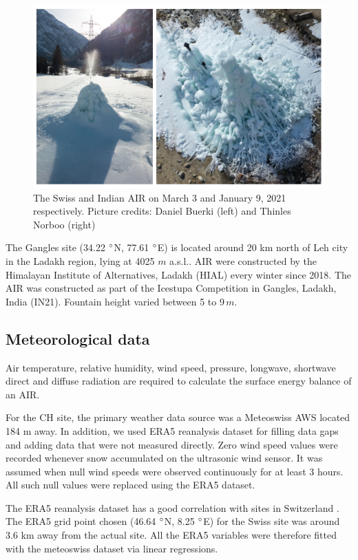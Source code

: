 \documentclass[utf8]{frontiersSCNS} %
\begin{document}
\begin{figure}
	\begin{center}
		\includegraphics[width=12 cm]{Figures/2AIR.jpg}
	\end{center}
	\caption{The Swiss and Indian AIR on March 3 and January 9, 2021 respectively. Picture credits: Daniel Buerki (left)
		and Thinles Norboo (right)}
	\label{fig:CHsite}
\end{figure}

The Gangles site (34.22 $\degree$N, 77.61 $\degree$E) is located around 20 km north of Leh city in the Ladakh region, lying at 4025 $m$ a.s.l.. AIR were constructed by the Himalayan Institute of Alternatives, Ladakh (HIAL) every winter since 2018. The AIR was constructed as part of the Icestupa Competition in Gangles, Ladakh, India (IN21). Fountain height varied between 5 to 9\,$m$.

\subsection{Meteorological data}
Air temperature, relative humidity, wind speed, pressure, longwave, shortwave direct and diffuse radiation are required to calculate the surface energy balance of an AIR.

For the CH site, the primary weather data source was a Meteoswiss AWS located 184 m away. In addition, we used ERA5 reanalysis dataset \citep{era5} for filling data gaps and adding data that were not measured directly. Zero wind speed values were recorded whenever snow accumulated on the ultrasonic wind sensor. It was assumed when null wind speeds were observed continuously for at least 3 hours. All such null values were replaced using the ERA5 dataset.

The ERA5 reanalysis dataset has a good correlation with sites in Switzerland \citep{Scherrer_2020}. The ERA5 grid point chosen (46.64 $\degree$N, 8.25 $\degree$E) for the Swiss site was around 3.6 km away from the actual site.  All the ERA5 variables were therefore fitted with the meteoswiss dataset via linear regressions.
\end{document}
